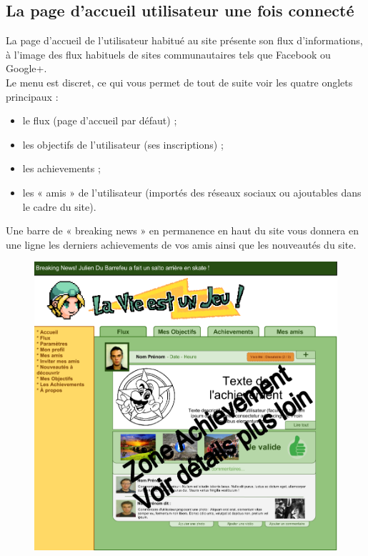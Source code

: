\documentclass{life-fr}
\begin{document}
\subsection{La page d'accueil utilisateur une fois connecté}

La page d'accueil de l'utilisateur habitué au site présente son flux d'informations, à l'image des flux habituels de sites communautaires tels que Facebook ou Google+. \\

Le menu est discret, ce qui vous permet de tout de suite voir les quatre onglets principaux :

\begin{itemize}
	\item le flux (page d'accueil par défaut) ;
	\item les objectifs de l'utilisateur (ses inscriptions) ;
	\item les achievements ;
	\item les « amis » de l'utilisateur (importés des réseaux sociaux ou ajoutables dans le cadre du site).
\end{itemize}

Une barre de « breaking news » en permanence en haut du site vous donnera en une ligne les derniers achievements de vos amis ainsi que les nouveautés du site.

\begin{figure}[H]
	\begin{center}
		\includegraphics[width=15cm]{img/accueil.png}
	\end{center}
\end{figure}
\end{document}
